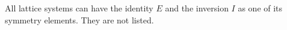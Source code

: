 \documentclass[11pt,a4paper]{report}
\begin{document}
All lattice systems can have the identity $E$ and the inversion $I$ as
one of its symmetry elements. They are not listed.


\end{document}
